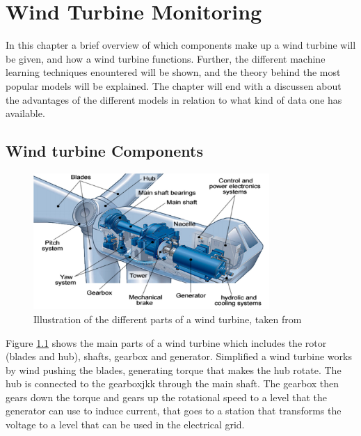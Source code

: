 \chapter{Wind Turbine Monitoring} \label{s:wt_monitoring}

In this chapter a brief overview of which components make up a wind turbine will be given, and how a wind turbine functions. 
Further, the different machine learning techniques enountered will be shown, and the theory behind the most popular models will be explained. The chapter will end with a discussen about the advantages of the different models in relation to what kind of data one has available.

\section{Wind turbine Components}

\begin{figure}[h]
    \begin{center}
    \includegraphics[width=0.8\textwidth]{wind_turbine/wt_parts.png}
    \end{center}
    \caption{Illustration of the different parts of a wind turbine, taken from \textcite{adv_meth_for_wt_cond_monit_rev}}
    \label{fig:wt_parts}
\end{figure}

Figure \ref{fig:wt_parts} shows the main parts of a wind turbine which includes the rotor (blades and hub), shafts, gearbox and generator. 
Simplified a wind turbine works by wind pushing the blades, generating torque that makes the hub rotate. 
The hub is connected to the gearboxjkk through the main shaft. 
The gearbox then gears down the torque and gears up the rotational speed to a level that the generator can use to induce current, that goes to a station that transforms the voltage to a level that can be used in the electrical grid. 


